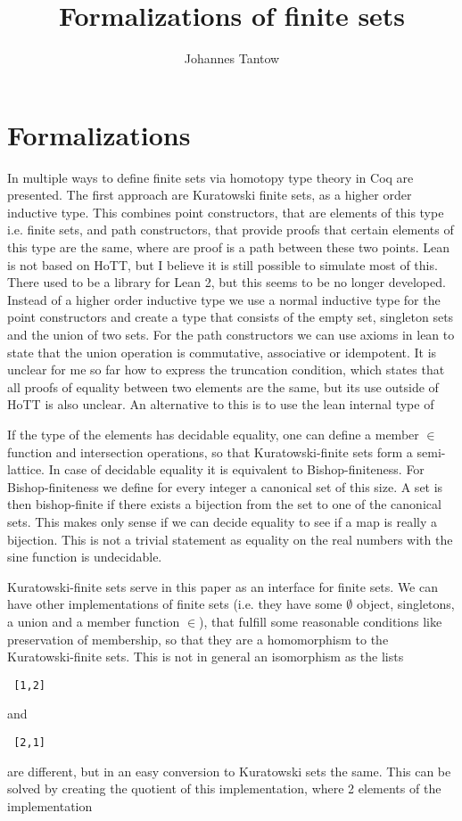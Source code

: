 \documentclass{article}
\title{Formalizations of finite sets}
\author{Johannes Tantow}
\begin{document}
\maketitle 
\section{Formalizations}
In \cite{HoTT-FinSets} multiple ways to define finite sets via homotopy type theory in Coq are presented. The first approach are Kuratowski finite sets, as a higher order inductive type. This combines point constructors, that are elements of this type i.e. finite sets, and path constructors, that provide proofs that certain elements of this type are the same, where are proof is a path between these two points.
Lean is not based on HoTT, but I believe it is still possible to simulate most of this. There used to be a library for Lean 2, but this seems to be no longer developed. Instead of a higher order inductive type we use a normal inductive type for the point constructors and create a type that consists of the empty set, singleton sets and the union of two sets. For the path constructors we can use axioms in lean to state that the union operation is commutative, associative or idempotent. It is unclear for me so far how to express the truncation condition, which states that all proofs of equality between two elements are the same, but its use outside of HoTT is also unclear.
An alternative to this is to use the lean internal type of 

If the type of the elements has decidable equality, one can define a member $\in$ function and intersection operations, so that Kuratowski-finite sets form a semi-lattice. In case of decidable equality it is equivalent to Bishop-finiteness. For Bishop-finiteness we define for every integer a canonical set of this size. A set is then bishop-finite if there exists a bijection from the set to one of the canonical sets. This makes only sense if we can decide equality to see if a map is really a bijection. This is not a trivial statement as equality on the real numbers with the sine function is undecidable.\cite{Richardson}

Kuratowski-finite sets serve in this paper as an interface for finite sets. We can have other implementations of finite sets (i.e. they have some $\emptyset$ object, singletons, a union and a member function $\in$), that fulfill some reasonable conditions like preservation of membership, so that they are a homomorphism to the Kuratowski-finite sets.
This is not in general an isomorphism as the lists \begin{verbatim} [1,2]\end{verbatim} and \begin{verbatim} [2,1]\end{verbatim}  are different, but in an easy conversion to Kuratowski sets the same. This can be solved by creating the quotient of this implementation, where 2 elements of the implementation 
\end{document}
